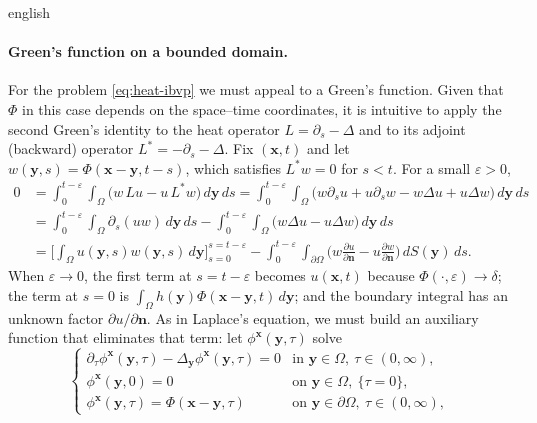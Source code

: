 \documentclass[../0000.tex]{subfiles}
\begin{document}
\begin{hyphenrules}{english}
\paragraph{Green's function on a bounded domain.}
For the problem \eqref{eq:heat-ibvp} we must appeal to a Green's function. Given that
$\Phi$ in this case depends on the space--time coordinates, it is intuitive to apply the second Green's
identity to the heat operator $L=\partial_s-\Delta$ and to its adjoint (backward) operator
$L^{*}=-\partial_s-\Delta$. Fix $(\mathbf{x},t)$ and let $w(\mathbf{y},s)=\Phi(\mathbf{x}-\mathbf{y},t-s)$, which satisfies $L^{*}w=0$
for $s<t$. For a small $\varepsilon>0$,
\begin{align}
  0&=\int_0^{t-\varepsilon}\!\!\int_\Omega\big(w\,Lu-u\,L^{*}w\big)\,d\mathbf{y}\,d s
    =\int_0^{t-\varepsilon}\!\!\int_\Omega\big(w\partial_s u+u\partial_s w-w\Delta u+u\Delta w\big)\,d\mathbf{y}\,d s
    \label{eq:heat-green-a}\\
   &=\int_0^{t-\varepsilon}\!\!\int_\Omega\partial_s(uw)\,d\mathbf{y}\,d s
    -\int_0^{t-\varepsilon}\!\!\int_\Omega\big(w\Delta u-u\Delta w\big)\,d\mathbf{y}\,d s
    \label{eq:heat-green-b}\\
   &=\Big[\int_\Omega u(\mathbf{y},s)w(\mathbf{y},s)\,d\mathbf{y}\Big]_{s=0}^{s=t-\varepsilon}
    -\int_0^{t-\varepsilon}\!\!\int_{\partial\Omega}\Big(w\frac{\partial u}{\partial\mathbf{n}}
    -u\frac{\partial w}{\partial\mathbf{n}}\Big)\,d S(\mathbf{y})\,d s.
    \label{eq:heat-green-c}
\end{align}
When $\varepsilon\to0$, the first term at $s=t-\varepsilon$ becomes $u(\mathbf{x},t)$ because
$\Phi(\cdot,\varepsilon)\to\delta$; the term at $s=0$ is $\int_\Omega h(\mathbf{y})\Phi(\mathbf{x}-\mathbf{y},t)\,d\mathbf{y}$; and the
boundary integral has an unknown factor $\partial u/\partial\mathbf{n}$. As in Laplace's equation, we must build
an auxiliary function that eliminates that term: let $\phi^{\mathbf{x}}(\mathbf{y},\tau)$ solve
\begin{equation}
  \begin{cases}
    \partial_\tau\phi^{\mathbf{x}}(\mathbf{y},\tau)-\Delta_{\mathbf{y}}\phi^{\mathbf{x}}(\mathbf{y},\tau)=0 & \text{in } \mathbf{y}\in\Omega,\ \tau\in(0,\infty),\\
    \phi^{\mathbf{x}}(\mathbf{y},0)=0 & \text{on } \mathbf{y}\in\Omega,\ \{\tau=0\},\\
    \phi^{\mathbf{x}}(\mathbf{y},\tau)=\Phi(\mathbf{x}-\mathbf{y},\tau) & \text{on } \mathbf{y}\in\partial\Omega,\ \tau\in(0,\infty),
  \end{cases}

\end{equation}
\end{hyphenrules}
\end{document}
